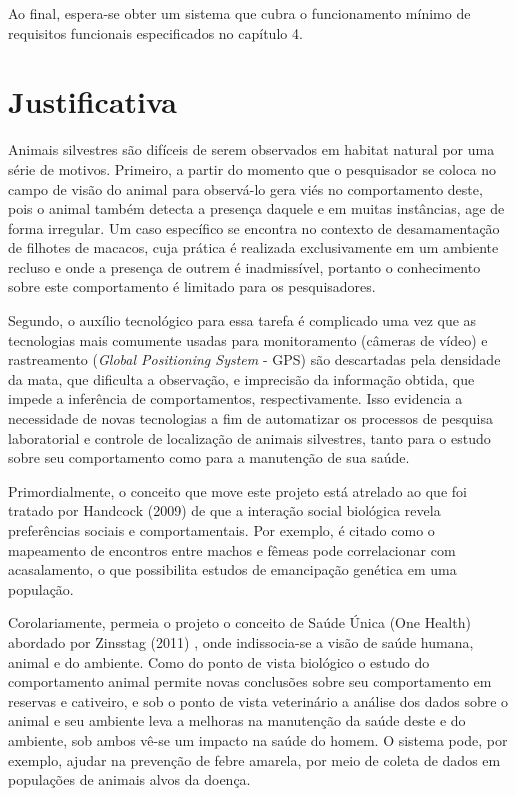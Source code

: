 Ao final, espera-se obter um sistema que cubra o funcionamento mínimo de requisitos funcionais especificados no capítulo 4.

\section{Justificativa}
Animais silvestres são difíceis de serem observados em habitat natural por uma série de motivos. Primeiro, a partir do momento que o pesquisador se coloca no campo de visão do animal para observá-lo gera viés no comportamento deste, pois o animal também detecta a presença daquele e em muitas instâncias, age de forma irregular. Um caso específico se encontra no contexto de desamamentação de filhotes de macacos, cuja prática é realizada exclusivamente em um ambiente recluso e onde a presença de outrem é inadmissível, portanto o conhecimento sobre este comportamento é limitado para os pesquisadores.

Segundo, o auxílio tecnológico para essa tarefa é complicado uma vez que as tecnologias mais comumente usadas para monitoramento (câmeras de vídeo)  e rastreamento (\emph{Global Positioning System} - GPS) são descartadas pela densidade da mata, que dificulta a observação, e imprecisão da informação obtida, que impede a inferência de comportamentos, respectivamente. Isso evidencia a necessidade de novas tecnologias a fim de automatizar os processos de pesquisa laboratorial e controle de localização de animais silvestres, tanto para o estudo sobre seu comportamento como para a manutenção de sua saúde.

Primordialmente, o conceito que move este projeto está atrelado ao que foi tratado por Handcock (2009) \cite{handcock} de que a interação social biológica revela preferências sociais e comportamentais. Por exemplo, é citado como o mapeamento de encontros entre machos e fêmeas pode correlacionar com acasalamento, o que possibilita estudos de emancipação genética em uma população.

Corolariamente, permeia o projeto o conceito de Saúde Única (One Health) abordado por Zinsstag (2011) \cite{zinsstag}, onde indissocia-se a visão de saúde humana, animal e do ambiente. Como do ponto de vista biológico o estudo do comportamento animal permite novas conclusões sobre seu comportamento em reservas e cativeiro, e sob o ponto de vista veterinário a análise dos dados sobre o animal e seu ambiente leva a melhoras na manutenção da saúde deste e do ambiente, sob ambos vê-se um impacto na saúde do homem. O sistema pode, por exemplo, ajudar na prevenção de febre amarela, por meio de coleta de dados em populações de animais alvos da doença.


